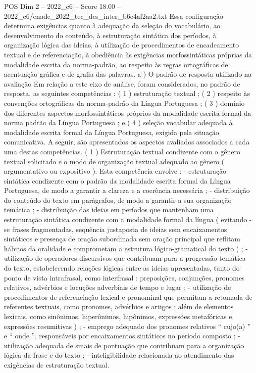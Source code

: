 \begin{textsample}{POS Dim 2 – 2022\_c6 – Score 18.00 – 2022\_c6/enade\_2022\_tec\_des\_inter\_b6c4af2aa2.txt}
Essa configuração determina exigências quanto à adequação da seleção do vocabulário, ao desenvolvimento do conteúdo, à estruturação sintática dos períodos, à organização lógica das ideias, à utilização de procedimentos de encadeamento textual e de referenciação, à obediência às exigências morfossintáticas próprias da modalidade escrita da norma-padrão, ao respeito às regras ortográficas de acentuação gráfica e de grafia das palavras. a ) O padrão de resposta utilizado na avaliação Em relação a este eixo de análise, foram considerados, no padrão de resposta, as seguintes competências : ( 1 ) estruturação textual ; ( 2 ) respeito às convenções ortográficas da norma-padrão da Língua Portuguesa ; ( 3 ) domínio dos diferentes aspectos morfossintáticos próprios da modalidade escrita formal da norma padrão da Língua Portuguesa ; e ( 4 ) seleção vocabular adequada à modalidade escrita formal da Língua Portuguesa, exigida pela situação comunicativa.
A seguir, são apresentados os aspectos avaliados associados a cada uma destas competências. ( 1 ) Estruturação textual condizente com o gênero textual solicitado e o modo de organização textual adequado ao gênero ( argumentativo ou expositivo ).
Esta competência envolve : - estruturação sintática condizente com o padrão da modalidade escrita formal da Língua Portuguesa, de modo a garantir a clareza e a coerência necessária ; - distribuição do conteúdo do texto em parágrafos, de modo a garantir a sua organização temática ; - distribuição das ideias em períodos que mantenham uma estruturação sintática condizente com a modalidade formal da língua ( evitando -se frases fragmentadas, sequência justaposta de ideias sem encaixamentos sintáticos e presença de oração subordinada sem oração principal que reflitam hábitos da oralidade e comprometam a estrutura lógico-gramatical do texto ) ; - utilização de operadores discursivos que contribuam para a progressão temática do texto, estabelecendo relações lógicas entre as ideias apresentadas, tanto do ponto de vista intrafrasal, como interfrasal : preposições, conjunções, pronomes relativos, advérbios e locuções adverbiais de tempo e lugar ; - utilização de procedimentos de referenciação lexical e pronominal que permitam a retomada de referentes textuais, como pronomes, advérbios e artigos ; além de elementos lexicais, como sinônimos, hiperônimos, hipônimos, expressões metafóricas e expressões resumitivas ) ; - emprego adequado dos pronomes relativos “ cujo(a) ” e “ onde ”, responsáveis por encaixamentos sintáticos no período composto ; - utilização adequada de sinais de pontuação que contribuam para a organização lógica da frase e do texto ; - inteligibilidade relacionada ao atendimento das exigências de estruturação textual.

\end{textsample}
